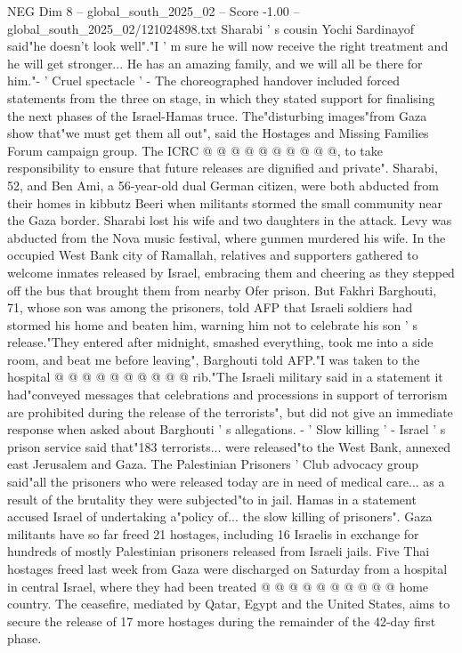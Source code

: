 \begin{textsample}{NEG Dim 8 – global\_south\_2025\_02 – Score -1.00 – global\_south\_2025\_02/121024898.txt}
Sharabi ' s cousin Yochi Sardinayof said"he doesn't look well"."I ' m sure he will now receive the right treatment and he will get stronger...
He has an amazing family, and we will all be there for him."- ' Cruel spectacle ' - The choreographed handover included forced statements from the three on stage, in which they stated support for finalising the next phases of the Israel-Hamas truce.
The"disturbing images"from Gaza show that"we must get them all out", said the Hostages and Missing Families Forum campaign group.
The ICRC @ @ @ @ @ @ @ @ @ @, to take responsibility to ensure that future releases are dignified and private".
Sharabi, 52, and Ben Ami, a 56-year-old dual German citizen, were both abducted from their homes in kibbutz Beeri when militants stormed the small community near the Gaza border.
Sharabi lost his wife and two daughters in the attack.
Levy was abducted from the Nova music festival, where gunmen murdered his wife.
In the occupied West Bank city of Ramallah, relatives and supporters gathered to welcome inmates released by Israel, embracing them and cheering as they stepped off the bus that brought them from nearby Ofer prison.
But Fakhri Barghouti, 71, whose son was among the prisoners, told AFP that Israeli soldiers had stormed his home and beaten him, warning him not to celebrate his son ' s release."They entered after midnight, smashed everything, took me into a side room, and beat me before leaving", Barghouti told AFP."I was taken to the hospital @ @ @ @ @ @ @ @ @ @ rib."The Israeli military said in a statement it had"conveyed messages that celebrations and processions in support of terrorism are prohibited during the release of the terrorists", but did not give an immediate response when asked about Barghouti ' s allegations. - ' Slow killing ' - Israel ' s prison service said that"183 terrorists... were released"to the West Bank, annexed east Jerusalem and Gaza.
The Palestinian Prisoners ' Club advocacy group said"all the prisoners who were released today are in need of medical care... as a result of the brutality they were subjected"to in jail.
Hamas in a statement accused Israel of undertaking a"policy of... the slow killing of prisoners".
Gaza militants have so far freed 21 hostages, including 16 Israelis in exchange for hundreds of mostly Palestinian prisoners released from Israeli jails.
Five Thai hostages freed last week from Gaza were discharged on Saturday from a hospital in central Israel, where they had been treated @ @ @ @ @ @ @ @ @ @ home country.
The ceasefire, mediated by Qatar, Egypt and the United States, aims to secure the release of 17 more hostages during the remainder of the 42-day first phase.

\end{textsample}
